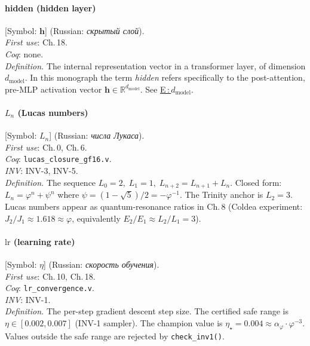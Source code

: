 \paragraph*{\textmd{\textbf{hidden (hidden layer)}}}
\label{entry:hidden}
[Symbol: $\mathbf{h}$] (Russian: \textit{скрытый слой}).\\
\textit{First use}: Ch.\,18.\\
\textit{Coq}: none.\\
\textit{Definition.}
The internal representation vector in a transformer layer, of dimension
$d_{\mathrm{model}}$.
In this monograph the term \emph{hidden} refers specifically to the
post-attention, pre-MLP activation vector $\mathbf{h} \in \mathbb{R}^{d_{\mathrm{model}}}$.
See \hyperref[entry:dmodel]{E\,:\,$d_{\mathrm{model}}$}.

\paragraph*{\textmd{\textbf{$L_n$ (Lucas numbers)}}}
\label{entry:lucas-numbers}
[Symbol: $L_n$] (Russian: \textit{числа Лукаса}).\\
\textit{First use}: Ch.\,0, Ch.\,6.\\
\textit{Coq}: \texttt{lucas\_closure\_gf16.v}.\\
\textit{INV}: INV-3, INV-5.\\
\textit{Definition.}
The sequence $L_0=2,\; L_1=1,\; L_{n+2}=L_{n+1}+L_n$.
Closed form: $L_n = \varphi^n + \psi^n$ where
$\psi = (1-\sqrt{5})/2 = -\varphi^{-1}$.
The Trinity anchor is $L_2 = 3$.
Lucas numbers appear as quantum-resonance ratios in Ch.\,8
(Coldea experiment: $J_2/J_1 \approx 1.618 \approx \varphi$,
equivalently $E_2/E_1 \approx L_2/L_1 = 3$).

\paragraph*{\textmd{\textbf{$\mathrm{lr}$ (learning rate)}}}
\label{entry:lr}
[Symbol: $\eta$] (Russian: \textit{скорость обучения}).\\
\textit{First use}: Ch.\,10, Ch.\,18.\\
\textit{Coq}: \texttt{lr\_convergence.v}.\\
\textit{INV}: INV-1.\\
\textit{Definition.}
The per-step gradient descent step size.
The certified safe range is $\eta \in [0.002, 0.007]$ (INV-1 sampler).
The champion value is $\eta_\star = 0.004 \approx \alpha_\varphi \cdot \varphi^{-3}$.
Values outside the safe range are rejected by \texttt{check\_inv1()}.

